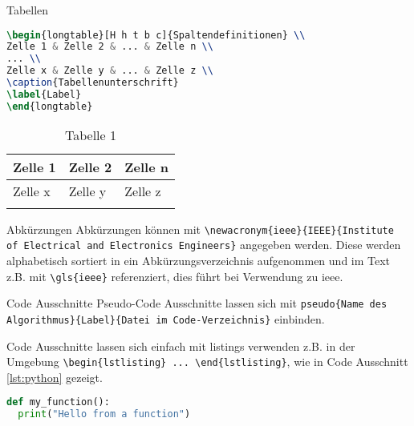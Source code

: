 \documentclass[a0paper,
landscape,
fontscale=0.332,
debug,
hyperref={pdfpagelabels=false}]{baposter}
\begin{document}
\begin{poster}
\begin{posterbox}[column=2,below=posterboxTwo, height=auto, name=posterboxFour]{Tabellen}
\begin{lstlisting}[caption=Tabelle, language=TeX, label=lst:table]
\begin{longtable}[H h t b c]{Spaltendefinitionen} \\
Zelle 1 & Zelle 2 & ... & Zelle n \\
... \\
Zelle x & Zelle y & ... & Zelle z \\
\caption{Tabellenunterschrift}
\label{Label}
\end{longtable}
\end{lstlisting}

\begin{longtable}[H]{|p{}|p{}|p{}|}
\hline
Zelle 1 & Zelle 2 & Zelle n \\
\hline
Zelle x & Zelle y & Zelle z \\
\hline
\caption{Tabelle 1}
\label{tab:tab1}
\end{longtable}
\end{posterbox}

\begin{posterbox}[column=2, height=bottom, below=posterboxFour, name=posterboxFive]{Abkürzungen}
Abkürzungen können mit \lstinline|\newacronym{ieee}{IEEE}{Institute of Electrical and Electronics Engineers}| angegeben werden. Diese werden alphabetisch sortiert in ein Abkürzungsverzeichnis aufgenommen und im Text z.B. mit \lstinline|\gls{ieee}| referenziert, dies führt bei Verwendung zu \gls{ieee}.
\end{posterbox}

\begin{posterbox}[column=3, height=auto, name=posterboxSix]{Code Ausschnitte}
Pseudo-Code Ausschnitte lassen sich mit \lstinline|pseudo{Name des Algorithmus}{Label}{Datei im Code-Verzeichnis}| einbinden.

Code Ausschnitte lassen sich einfach mit listings verwenden z.B. in der Umgebung \lstinline|\begin{lstlisting} ... \end{lstlisting}|, wie in Code Ausschnitt \ref{lst:python} gezeigt.

\begin{lstlisting}[language=Python, caption={Simple Python program}, label=lst:python]
def my_function():
  print("Hello from a function")
\end{lstlisting}
\end{posterbox}


\end{poster}
\end{document}
